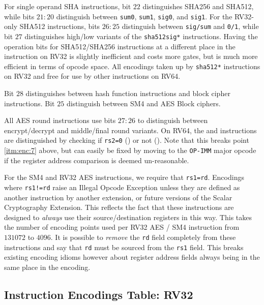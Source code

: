 For single operand SHA instructions,
bit $22$ distinguishes SHA256 and SHA512, while
bits $21:20$ distinguish between
{\tt sum0},
{\tt sum1},
{\tt sig0},
and
{\tt sig1}.
For the RV32-only SHA512 instructions,
bits $26:25$ distinguish between {\tt sig/sum} and {\tt 0/1},
while bit $27$ distinguishes high/low variants of the {\tt sha512sig*}
instructions.
Having the operation bits for SHA512/SHA256 instructions at a different place
in the instruction on RV32 is slightly inefficient and costs more gates,
but is much more efficient in terms of opcode space.
All encodings taken up by {\tt sha512*} instructions on RV32 and
free for use by other instructions on RV64.

Bit $28$ distinguishes between hash function instructions and block
cipher instructions.
Bit $25$ distinguish between SM4 and AES Block ciphers.

All AES round instructions use bits $27:26$ to distinguish between
encrypt/decrypt and middle/final round variants.
On RV64, the  and  instructions
are distinguished by checking if
{\tt rs2=0} () or not ().
Note that this breaks point \ref{itm:enc:7} above, but can easily be
fixed by moving  to the {\tt OP-IMM} major opcode
if the register address comparison is deemed un-reasonable.

For the SM4 and RV32 AES instructions, we require that {\tt rs1=rd}.
Encodings where {\tt rs1!=rd} raise an Illegal Opcode Exception unless
they are defined as another instruction by another extension, or
future versions of the Scalar Cryptography Extension.
This reflects the fact that these instructions are designed to {\em always}
use their source/destination registers in this way.
This takes the number of encoding points used per RV32 AES / SM4 instruction
from $131072$ to $4096$.
It is possible to {\em remove} the {\tt rd} field completely from these
instructions and say that {\tt rd} must be sourced from the {\tt rs1}
field.
This breaks existing encoding idioms however about register address fields
always being in the same place in the encoding.


\clearpage
\subsection{Instruction Encodings Table: RV32}


